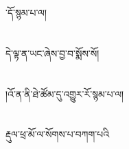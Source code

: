 ་དོ་སྙམ་པ་ལ།\chapter{ }དེ་ལྟ་ན་ཡང་ཞེས་བྱ་བ་སྨོས་སོ།\chapter{ }།འོ་ན་ནི་ཐེ་ཚོམ་དུ་འགྱུར་རོ་སྙམ་པ་ལ།\chapter{ }རྡུལ་ཕྲ་མོ་ལ་སོགས་པ་བཀག་པའི